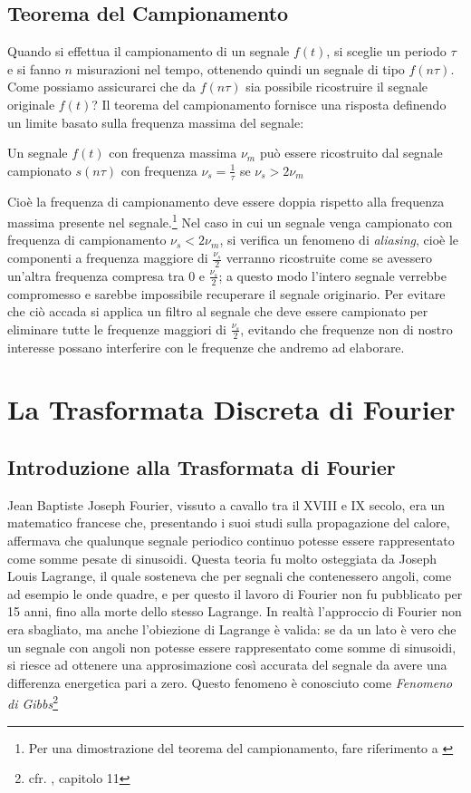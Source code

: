 \subsection{Teorema del Campionamento}
Quando si effettua il campionamento di un segnale $f(t)$, si sceglie un periodo
$\tau$ e si fanno $n$ misurazioni nel tempo, ottenendo quindi un segnale di
tipo $f(n\tau)$. Come possiamo assicurarci che da $f(n\tau)$ sia possibile
ricostruire il segnale originale $f(t)$?
Il teorema del campionamento fornisce una risposta definendo un limite basato
sulla frequenza massima del segnale:
\begin{theorem} \label{the:nyquist}
	Un segnale $f(t)$ con frequenza massima $\nu_m$ pu\`o essere ricostruito dal
	segnale campionato $s(n\tau)$ con frequenza $\nu_s = \frac{1}{\tau}$ se
	$\nu_s > 2\nu_m$
\end{theorem}
Cio\`e la frequenza di campionamento deve essere doppia rispetto alla frequenza
massima presente nel segnale.\footnote{Per una dimostrazione del teorema del
campionamento, fare riferimento a \cite{MDFT07}} Nel caso in cui un segnale venga campionato con
frequenza di campionamento $\nu_s < 2\nu_m$, si verifica un fenomeno di
\emph{aliasing}, cio\`e le componenti a frequenza maggiore di $\frac{\nu_s}{2}$
verranno ricostruite come se avessero un'altra frequenza compresa tra $0$ e
$\frac{\nu_s}{2}$; a questo modo l'intero segnale verrebbe compromesso e sarebbe
impossibile recuperare il segnale originario. Per evitare che ci\`o accada si
applica un filtro al segnale che deve essere campionato per eliminare tutte le
frequenze maggiori di $\frac{\nu_s}{2}$, evitando che frequenze non di nostro
interesse possano interferire con le frequenze che andremo ad elaborare.

\section{La Trasformata Discreta di Fourier}
\subsection{Introduzione alla Trasformata di Fourier}
Jean Baptiste Joseph Fourier, vissuto a cavallo tra il XVIII e IX secolo, era
un matematico francese che, presentando i suoi  studi sulla propagazione del
calore, affermava che qualunque segnale periodico continuo potesse essere
rappresentato come somme pesate di sinusoidi. Questa teoria fu molto osteggiata
da Joseph Louis Lagrange, il quale sosteneva che per segnali che contenessero
angoli, come ad esempio le onde quadre, e per questo il lavoro di Fourier non fu
pubblicato per 15 anni, fino alla morte dello stesso Lagrange. In realt\`a
l'approccio di Fourier non era sbagliato, ma anche l'obiezione di Lagrange \`e
valida: se da un lato \`e vero che un segnale con angoli non potesse essere
rappresentato come somme di sinusoidi, si riesce ad ottenere una approsimazione
cos\`i accurata del segnale da avere una differenza energetica pari a zero.
Questo fenomeno \`e conosciuto come \emph{Fenomeno di Gibbs}\footnote{cfr.
\cite{TSEGDSP97}, capitolo 11}


